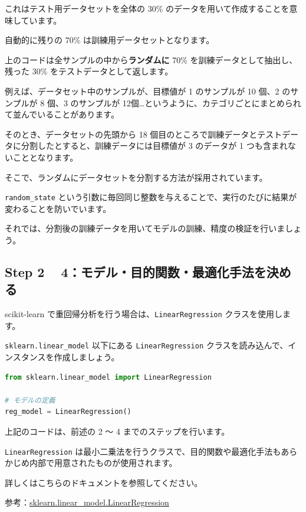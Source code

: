 これはテスト用データセットを全体の 30\% のデータを用いて作成することを意味しています。

自動的に残りの 70\% は訓練用データセットとなります。

上のコードは全サンプルの中から\textbf{ランダムに} 70\% を訓練データとして抽出し、残った 30\% をテストデータとして返します。



例えば、データセット中のサンプルが、目標値が 1 のサンプルが 10 個、2 のサンプルが 8 個、3 のサンプルが 12個…というように、カテゴリごとにまとめられて並んでいることがあります。

そのとき、データセットの先頭から 18 個目のところで訓練データとテストデータに分割したとすると、訓練データには目標値が 3 のデータが 1 つも含まれないこととなります。


そこで、ランダムにデータセットを分割する方法が採用されています。

\texttt{random\_state} という引数に毎回同じ整数を与えることで、実行のたびに結果が変わることを防いでいます。


それでは、分割後の訓練データを用いてモデルの訓練、精度の検証を行いましょう。


\subsection{Step 2 ~ 4：モデル・目的関数・最適化手法を決める}


scikit-learn で重回帰分析を行う場合は、\texttt{LinearRegression} クラスを使用します。

\texttt{sklearn.linear\_model} 以下にある \texttt{LinearRegression} クラスを読み込んで、インスタンスを作成しましょう。


\begin{lstlisting}[style=codecell,language=Python]
from sklearn.linear_model import LinearRegression

# モデルの定義
reg_model = LinearRegression()
\end{lstlisting}

上記のコードは、前述の 2 〜 4 までのステップを行います。

\texttt{LinearRegression} は最小二乗法を行うクラスで、目的関数や最適化手法もあらかじめ内部で用意されたものが使用されます。

詳しくはこちらのドキュメントを参照してください。

参考：\href{https://scikit-learn.org/stable/modules/generated/sklearn.linear_model.LinearRegression.html#sklearn.linear_model.LinearRegression}{sklearn.linear\_model.LinearRegression}



